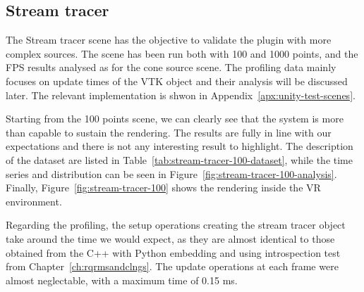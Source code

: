 \subsection{Stream tracer}

The Stream tracer scene has the objective to validate the plugin with more complex sources. The scene has been run both with 100 and 1000 points, and the FPS results analysed as for the cone source scene. The profiling data mainly focuses on update times of the VTK object and their analysis will be discussed later. The relevant implementation is shwon in Appendix~\ref{apx:unity-test-scenes}.

Starting from the 100 points scene, we can clearly see that the system is more than capable to sustain the rendering. The results are fully in line with our expectations and there is not any interesting result to highlight. The description of the dataset are listed in Table~\ref{tab:stream-tracer-100-dataset}, while the time series and distribution can be seen in Figure~\ref{fig:stream-tracer-100-analysis}. Finally, Figure~\ref{fig:stream-tracer-100} shows the rendering inside the VR environment.

Regarding the profiling, the setup operations creating the stream tracer object take around the time we would expect, as they are almost identical to those obtained from the C++ with Python embedding and using introspection test from Chapter~\ref{ch:rqrmsandclngs}. The update operations at each frame were almost neglectable, with a maximum time of 0.15 ms.

